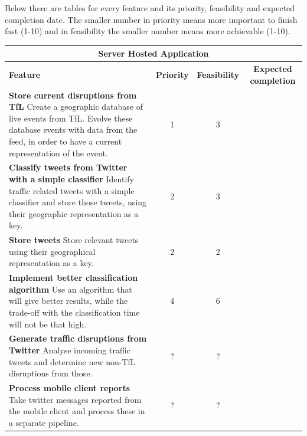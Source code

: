 Below there are tables for every feature and its priority, feasibility and expected completion date. The smaller number in priority means more important to finish fast (1-10) and in feasibility the smaller number means more achievable (1-10).

\begin{center}
\begin{tabular}{ | p{6cm} | c | c | c | }
\hline
\multicolumn{4}{|c|}{\textbf{Server Hosted Application}} \\ \hline
\textbf{Feature} & \textbf{Priority} & \textbf{Feasibility} & \textbf{Expected completion} \\ \hline
\textbf{Store current disruptions from TfL} \newline
Create a geographic database of live events from TfL. Evolve these database events with data from the feed, in order to have a current representation of the event. & 1 & 3 & \\ \hline
\textbf{Classify tweets from Twitter with a simple classifier} \newline
Identify traffic related tweets with a simple classifier and store those tweets, using their geographic representation as a key. & 2 & 3 & \\ \hline
\textbf{Store tweets} \newline
Store relevant tweets using their geographical representation as a key. & 2 & 2 & \\ \hline
\textbf{Implement better classification algorithm} \newline
Use an algorithm that will give better results, while the trade-off with the classification time will not be that high. & 4 & 6 & \\ \hline
\textbf{Generate traffic disruptions from Twitter} \newline
Analyse incoming traffic tweets and determine new non-TfL disruptions from those. & ? & ? & \\ \hline
\textbf{Process mobile client reports} \newline
Take twitter messages reported from the mobile client and process these in a separate pipeline. & ? & ? & \\ \hline
\end{tabular}
\end{center}

